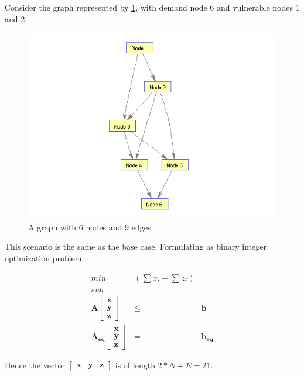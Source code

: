 \documentclass[authoryear,preprint,review,12pt]{elsarticle}
\begin{document}
Consider the graph represented by \ref{fig:small_network}, with demand node 6 and
vulnerable nodes 1 and 2.

\begin{figure}[ht]
\includegraphics[scale=0.75]{images/testGraph}\caption{A graph with 6 nodes and 9 edges}
    \label{fig:small_network}
\end{figure} %

This scenario is the same as the base case.
Formulating as binary integer optimization problem:

\begin{eqnarray*}
min & (\sum x_{i}+\sum z_{i})\\
sub\\
\mathbf{A}\left[\begin{array}{c}
\mathbf{x}\\
\mathbf{y}\\
\mathbf{z}
\end{array}\right] & \leq & \mathbf{b}\\
\mathbf{A_{eq}}\left[\begin{array}{c}
\mathbf{x}\\
\mathbf{y}\\
\mathbf{z}
\end{array}\right] & = & \mathbf{b_{eq}}
\end{eqnarray*}


Hence the vector $\left[\mathbf{\begin{array}{ccc}
\mathbf{x} & y & z\end{array}}\right]$ is of length $2*N+E=21$.
\end{document}
